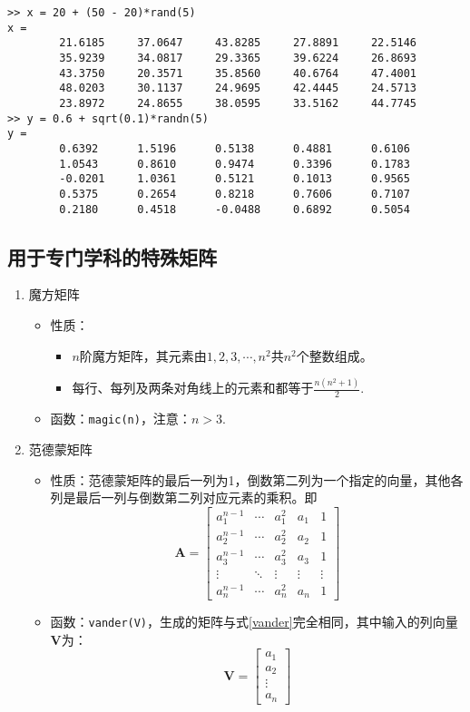 \begin{lstlisting}
>> x = 20 + (50 - 20)*rand(5)
x = 
		21.6185		37.0647		43.8285		27.8891		22.5146
		35.9239		34.0817		29.3365		39.6224		26.8693
		43.3750		20.3571		35.8560		40.6764		47.4001
		48.0203		30.1137		24.9695		42.4445		24.5713
		23.8972		24.8655		38.0595		33.5162		44.7745
>> y = 0.6 + sqrt(0.1)*randn(5)
y =
		0.6392		1.5196		0.5138		0.4881		0.6106
		1.0543		0.8610		0.9474		0.3396		0.1783
		-0.0201		1.0361		0.5121		0.1013		0.9565
		0.5375		0.2654		0.8218		0.7606		0.7107
		0.2180		0.4518		-0.0488		0.6892		0.5054
\end{lstlisting}

\subsection{用于专门学科的特殊矩阵}
\begin{enumerate}
	\item 魔方矩阵
	\begin{itemize}
		\item 性质：
		\begin{itemize}
			\item $n$阶魔方矩阵，其元素由$1, 2, 3, \cdots, n^2$共$n^2$个整数组成。
			\item 每行、每列及两条对角线上的元素和都等于$\displaystyle \frac{n(n^2+1)}{2}$.
		\end{itemize}
	\item 函数：\lstinline|magic(n)|，注意：$n>3$.
	\end{itemize}
\item 范德蒙矩阵
	\begin{itemize}
		\item 性质：范德蒙矩阵的最后一列为1，倒数第二列为一个指定的向量，其他各列是最后一列与倒数第二列对应元素的乘积。即
		\begin{equation}
			\bm{A} =
			\begin{bmatrix}
				a_1^{n-1} & \cdots & a_1^2 & a_1 & 1\\
				a_2^{n-1} & \cdots & a_2^2 & a_2 & 1\\
				a_3^{n-1} & \cdots & a_3^2 & a_3 & 1\\
				\vdots & \ddots & \vdots & \vdots & \vdots\\
				a_n^{n-1} & \cdots & a_n^2 & a_n & 1
			\end{bmatrix}
		\label{vander}
		\end{equation}
	\item 函数：\lstinline|vander(V)|，生成的矩阵与式\eqref{vander}完全相同，其中输入的列向量$\bm{V}$为：
	\begin{equation*}
		\bm{V} =
		\begin{bmatrix}
			a_1\\
			a_2\\
			\vdots\\
			a_n
		\end{bmatrix}
	\end{equation*}
	\end{itemize}


\end{enumerate}
